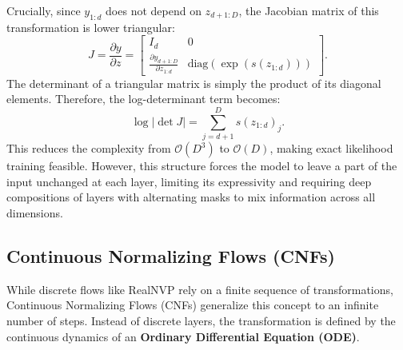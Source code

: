 \documentclass{article}
\begin{document}
Crucially, since $y_{1:d}$ does not depend on $z_{d+1:D}$, the Jacobian matrix of this transformation is lower triangular:
\begin{equation}
    J = \frac{\partial y}{\partial z} =
    \begin{bmatrix}
    I_d & 0 \\
    \frac{\partial y_{d+1:D}}{\partial z_{1:d}} & \text{diag}(\exp(s(z_{1:d})))
    \end{bmatrix}.
\end{equation}
The determinant of a triangular matrix is simply the product of its diagonal elements. Therefore, the log-determinant term becomes:
\begin{equation}
    \log |\det J| = \sum_{j=d+1}^D s(z_{1:d})_j.
\end{equation}
This reduces the complexity from $\mathcal{O}(D^3)$ to $\mathcal{O}(D)$, making exact likelihood training feasible. However, this structure forces the model to leave a part of the input unchanged at each layer, limiting its expressivity and requiring deep compositions of layers with alternating masks to mix information across all dimensions.



\subsection{Continuous Normalizing Flows (CNFs)}


While discrete flows like RealNVP rely on a finite sequence of transformations, Continuous Normalizing Flows (CNFs) generalize this concept to an infinite number of steps. Instead of discrete layers, the transformation is defined by the continuous dynamics of an \textbf{Ordinary Differential Equation (ODE)}.
\end{document}
